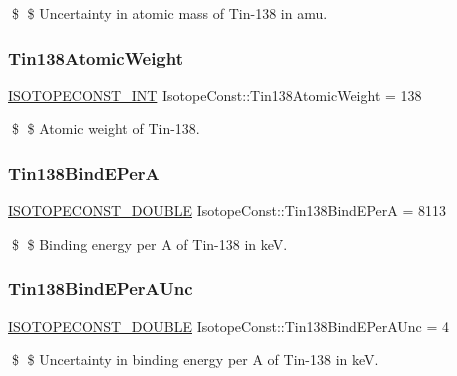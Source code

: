\$ \$ Uncertainty in atomic mass of Tin-\/138 in amu. \mbox{\label{group___isotope_const-_tin-_sn138_ga676602b2106fe7ecc2e1bb215dbaa084}} 
\subsubsection{\texorpdfstring{Tin138\+Atomic\+Weight}{Tin138AtomicWeight}}
{\footnotesize\ttfamily \mbox{\hyperlink{group___isotope_const-_macros_ga5f18360b3e99483a35c32d789e62621c}{I\+S\+O\+T\+O\+P\+E\+C\+O\+N\+S\+T\+\_\+\+I\+NT}} Isotope\+Const\+::\+Tin138\+Atomic\+Weight = 138}

\$ \$ Atomic weight of Tin-\/138. \mbox{\label{group___isotope_const-_tin-_sn138_ga3b35cdcb243ad65b6db08d123bcdc4ed}} 
\subsubsection{\texorpdfstring{Tin138\+Bind\+E\+PerA}{Tin138BindEPerA}}
{\footnotesize\ttfamily \mbox{\hyperlink{group___isotope_const-_macros_ga8f45a7272ce02c0b4c65c44636ed719a}{I\+S\+O\+T\+O\+P\+E\+C\+O\+N\+S\+T\+\_\+\+D\+O\+U\+B\+LE}} Isotope\+Const\+::\+Tin138\+Bind\+E\+PerA = 8113}

\$ \$ Binding energy per A of Tin-\/138 in keV. \mbox{\label{group___isotope_const-_tin-_sn138_gaa524bb5bc58a1929f5947d588515663e}} 
\subsubsection{\texorpdfstring{Tin138\+Bind\+E\+Per\+A\+Unc}{Tin138BindEPerAUnc}}
{\footnotesize\ttfamily \mbox{\hyperlink{group___isotope_const-_macros_ga8f45a7272ce02c0b4c65c44636ed719a}{I\+S\+O\+T\+O\+P\+E\+C\+O\+N\+S\+T\+\_\+\+D\+O\+U\+B\+LE}} Isotope\+Const\+::\+Tin138\+Bind\+E\+Per\+A\+Unc = 4}

\$ \$ Uncertainty in binding energy per A of Tin-\/138 in keV. \mbox{\label{group___isotope_const-_tin-_sn138_ga351c61c411294bde1008635ebb0494af}} 
